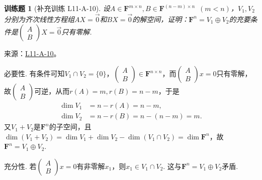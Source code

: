 \documentclass[12pt,fontset=fandol]{ctexart}
\newtheorem{exercise}{训练题}[section]
\begin{document}
\begin{exercise}[补充训练 L11-A-10]\label{prob:L11-A-10}
设$A \in \mathbf{F}^{m \times n},B \in \mathbf{F}^{(n-m) \times n}\enspace(m<n)$，$V_1,V_2$分别为齐次线性方程组$AX=\vec{0}$和$BX=\vec{0}$的解空间，证明：$\mathbf{F}^n=V_1\oplus V_2$的充要条件是$\begin{pmatrix} A \\ B \end{pmatrix}X=\vec{0}$只有零解.
\end{exercise}
\noindent 来源：\href{https://github.com/yhwu-is/Linear-Algebra-Left-Undone/blob/new/%E8%AE%B2%E4%B9%89/%E4%B8%93%E9%A2%98/11%20%E6%9C%9D%E8%8A%B1%E5%A4%95%E6%8B%BE.tex}{L11-A-10}。
\begin{solve}
必要性. 有条件可知$V_1\cap V_2=\{0\}$，$\begin{pmatrix}A\\B\end{pmatrix}\in\mathbf{F}^{n\times n}$，而$\begin{pmatrix}A\\B\end{pmatrix}x=0$只有零解，故$\begin{pmatrix}A\\B\end{pmatrix}$可逆，从而$r(A)=m,r(B)=n-m$，于是
          \begin{align*}
              \dim V_1 & =n-r(A)=n-m,       \\
              \dim V_2 & =n-r(B)=n-(n-m)=m.
          \end{align*}
          又$V_1+V_2$是$\mathbf{F}^n$的子空间，且$\dim(V_1+V_2)=\dim V_1+\dim V_2-\dim(V_1\cap V_2)=\dim\mathbf{F}^n$，故$\mathbf{F}^n=V_1\oplus V_2$.

          充分性. 若$\begin{pmatrix}A\\B\end{pmatrix}x=0$有非零解$x_1$，则$x_1\in V_1\cap V_2$. 这与$\mathbf{F}^n=V_1\oplus V_2$矛盾.
\end{solve}
\end{document}
